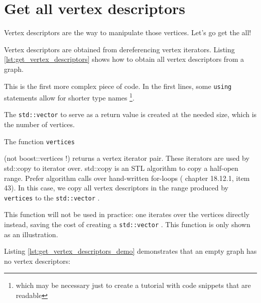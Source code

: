 

\section{Get all vertex descriptors}
\label{subsec:get_vertex_descriptors}

Vertex descriptors are the way to manipulate those vertices.
Let's go get the all!

Vertex descriptors are obtained from dereferencing vertex iterators.
Listing \ref{lst:get_vertex_descriptors}
shows how to obtain all vertex descriptors from a graph.



This is the first more complex piece of code.
In the first lines, some \verb;using; statements allow for shorter type names
\footnote{
  which may be necessary just to create a tutorial 
  with code snippets that are readable
}.

The 
\verb;std::vector;  
to serve as a return value is created at the needed size,
which is the number of vertices.

The function \verb;vertices; 

(not boost::vertices !) 
returns a vertex iterator pair.
These iterators are used by std::copy to iterator over.
std::copy 
is an STL algorithm to copy a half-open range.
Prefer algorithm calls over hand-written for-loops (
\cite{stroustrup1997} chapter 18.12.1, 
\cite{meyers2005effective} item 43).
In this case, we copy all vertex descriptors in the range produced 
by \verb;vertices; to the 
\verb;std::vector; .

This function will not be used in practice: one iterates over the vertices
directly instead, saving the cost of creating a 
\verb;std::vector; .
This function is only shown as an illustration.

Listing \ref{lst:get_vertex_descriptors_demo}
demonstrates that an empty graph has no vertex descriptors:

